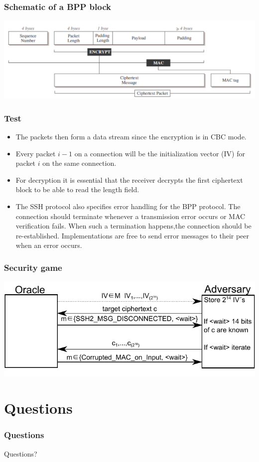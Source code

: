 \documentclass[fleqn]{beamer}
\begin{document}
  \begin{frame}
    \frametitle{Schematic of a BPP block}
    \begin{center}
    \includegraphics[scale=.4]{SSHBPP.pdf}
    \end{center}
  \end{frame}

  
    \begin{frame}
    \frametitle{Test}
	\begin{itemize}
	\item The packets then form a data stream since the encryption is in CBC mode. 
	\item Every packet $i-1$ on a connection will be the initialization vector (IV) for packet $i$ on the same connection.
	\item For decryption it is essential that the receiver decrypts the first ciphertext block to be able to read the length field.
	\item The SSH protocol also specifies error handling for the BPP protocol. The connection should terminate whenever a transmission error occurs or MAC verification fails. When such a termination happens,the connection should be re-established. Implementations are free to send error messages to their peer when an error occurs.
	\end{itemize}
  \end{frame}
  
  
    \begin{frame}
    \frametitle{Security game}
    \begin{center}
    \includegraphics[scale=.8]{drawing.pdf}
    \end{center}
  \end{frame}
  
\section{Questions}

  \begin{frame}
    \frametitle{Questions}
    \begin{center}
    Questions?
    \end{center}
  \end{frame}
\end{document}

